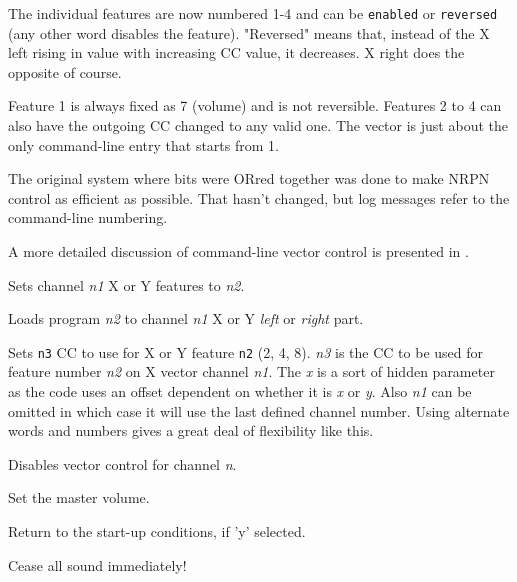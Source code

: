       The individual features are now numbered 1-4 and can be
       \texttt{enabled} or
       \texttt{reversed} (any
      other word disables the feature).
      "Reversed" means that, instead of the X left rising in
      value with increasing CC value, it decreases.
      X right does the opposite of course.

      Feature 1 is always fixed as 7 (volume) and is not reversible.
      Features 2 to 4 can also have the outgoing CC changed to any valid one.
      The vector is just about the only command-line
      entry that starts from 1.

      The original system where bits were ORred together was done to make NRPN
      control as efficient as possible. That hasn't changed, but log messages
      refer to the command-line numbering.

      A more detailed discussion of command-line vector control is presented in
      .

      Sets channel \textsl{n1} X or Y features to \textsl{n2}.

      Loads program \textsl{n2} to channel \textsl{n1} X or Y
      \textsl{left} or \textsl{right} part.

      Sets \texttt{n3} CC to use for X or Y feature \texttt{n2} (2, 4, 8).
      \textsl{n3} is the CC to be used for feature number \textsl{n2} on X
      vector channel \textsl{n1}. The \textsl{x} is a sort of hidden parameter
      as the code uses an offset dependent on whether it is \textsl{x} or
      \textsl{y}. Also \textsl{n1} can be omitted in which case it will use the
      last defined channel number. Using alternate words and numbers gives a
      great deal of flexibility like this.

      Disables vector control for channel \textsl{n}.

      Set the master volume.

      Return to the start-up conditions, if 'y' selected.

      Cease all sound immediately!

